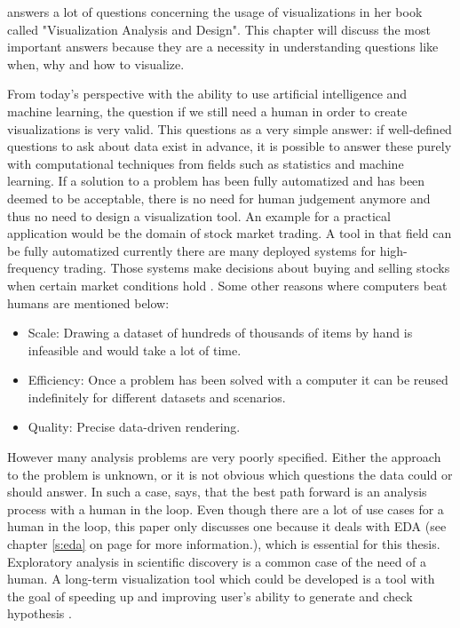 \citeauthor{Munzner2014} answers a lot of questions concerning the usage of visualizations in her book called "Visualization Analysis and Design". This chapter will discuss the most important answers because they are a necessity in understanding questions like when, why and how to visualize.

From today's perspective with the ability to use artificial intelligence and machine learning, the question if we still need a human in order to create visualizations is very valid. This questions as a very simple answer: if well-defined questions to ask about data exist in advance, it is possible to answer these purely with computational techniques from fields such as statistics and machine learning. If a solution to a problem has been fully automatized and has been deemed to be acceptable, there is no need for human judgement anymore and thus no need to design a visualization tool. An example for a practical application would be the domain of stock market trading. A tool in that field can be fully automatized currently there are many deployed systems for high-frequency trading. Those systems make decisions about buying and selling stocks when certain market conditions hold . Some other reasons where computers beat humans are mentioned below:
\begin{itemize}
\item Scale: Drawing a dataset of hundreds of thousands of items by hand is infeasible and would take a lot of time.
\item Efficiency: Once a problem has been solved with a computer it can be reused  indefinitely for different datasets and scenarios.
\item Quality: Precise data-driven rendering.
\end{itemize}
However many analysis problems are very poorly specified. Either the approach to the problem is unknown, or it is not obvious which questions the data could or should answer. In such a case, \citeauthor{Munzner2014} says, that the best path forward is an analysis process with a human in the loop. Even though there are a lot of use cases for a human in the loop, this paper only discusses one because it deals with \ac{EDA} (see chapter \ref{s:eda} on page\pageref{s:eda} for more information.), which is essential for this thesis. Exploratory analysis in scientific discovery is a common case of the need of a human. A long-term visualization tool which could be developed is a tool with the goal of speeding up and improving user's ability to generate and check hypothesis .

